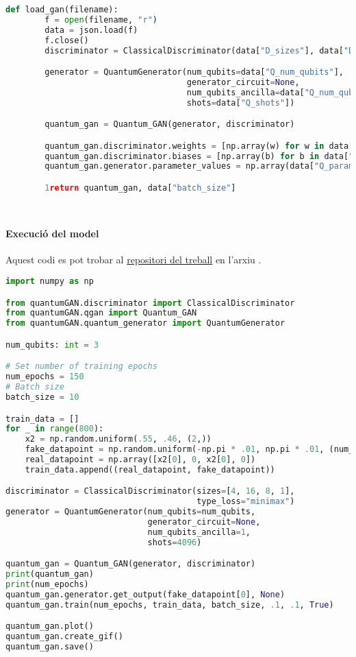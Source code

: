 \begin{lstlisting}[language=Python, caption=Codi per la definició del model]
	def load_gan(filename):
		f = open(filename, "r")
		data = json.load(f)
		f.close()
		discriminator = ClassicalDiscriminator(data["D_sizes"], data["D_loss"])

		generator = QuantumGenerator(num_qubits=data["Q_num_qubits"],
									 generator_circuit=None,
									 num_qubits_ancilla=data["Q_num_qubits_ancilla"],
									 shots=data["Q_shots"])

		quantum_gan = Quantum_GAN(generator, discriminator)

		quantum_gan.discriminator.weights = [np.array(w) for w in data["D_weights"]]
		quantum_gan.discriminator.biases = [np.array(b) for b in data["D_biases"]]
		quantum_gan.generator.parameter_values = np.array(data["Q_parameters"])

		1return quantum_gan, data["batch_size"]
	
	
\end{lstlisting}

\paragraph{Execució del model}
\label{lst:main}
Aquest codi es pot trobar al \href{https://github.com/tomiock/qGAN}{repositori del treball} en l'arxiu . 

\begin{lstlisting}[language=Python, caption=Codi final pel generador]
import numpy as np

from quantumGAN.discriminator import ClassicalDiscriminator
from quantumGAN.qgan import Quantum_GAN
from quantumGAN.quantum_generator import QuantumGenerator

num_qubits: int = 3

# Set number of training epochs
num_epochs = 150
# Batch size
batch_size = 10

train_data = []
for _ in range(800):
	x2 = np.random.uniform(.55, .46, (2,))
	fake_datapoint = np.random.uniform(-np.pi * .01, np.pi * .01, (num_qubits,))
	real_datapoint = np.array([x2[0], 0, x2[0], 0])
	train_data.append((real_datapoint, fake_datapoint))

discriminator = ClassicalDiscriminator(sizes=[4, 16, 8, 1],
									   type_loss="minimax")
generator = QuantumGenerator(num_qubits=num_qubits,
							 generator_circuit=None,
							 num_qubits_ancilla=1,
							 shots=4096)

quantum_gan = Quantum_GAN(generator, discriminator)
print(quantum_gan)
print(num_epochs)
quantum_gan.generator.get_output(fake_datapoint[0], None)
quantum_gan.train(num_epochs, train_data, batch_size, .1, .1, True)

quantum_gan.plot()
quantum_gan.create_gif()
quantum_gan.save()

\end{lstlisting}



